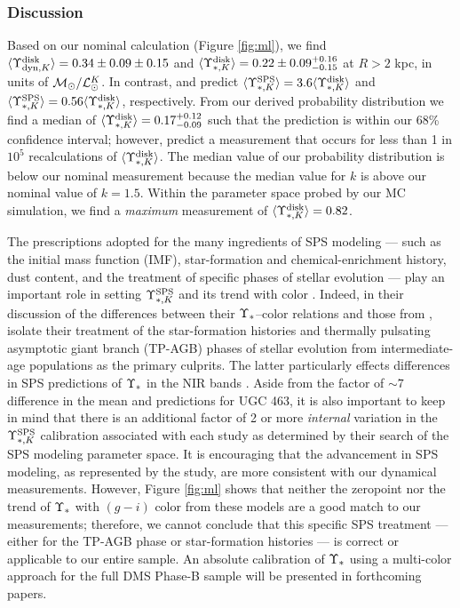 \documentclass[apj,iop,numberedappendix]{emulateapj}
\begin{document}
\subsubsection{Discussion}
\label{sec:mldisc}

Based on our nominal calculation (Figure \ref{fig:ml}), we find
$\langle \Upsilon_{{\rm dyn},K}^{\rm disk} \rangle = 0.34\pm0.09\pm0.15$ and $\langle \Upsilon_{\ast,K}^{\rm disk} \rangle =
0.22\pm0.09^{+0.16}_{-0.15}$ at $R>2$ kpc, in units of $\mathcal{M}_\odot/\mathcal{L}_\odot^K$.  In
contrast,  and 
predict $\langle \Upsilon_{\ast,K}^{\rm SPS} \rangle = 3.6 \langle \Upsilon_{\ast,K}^{\rm disk} \rangle$ and $\langle \Upsilon_{\ast,K}^{\rm SPS} \rangle =
0.56 \langle \Upsilon_{\ast,K}^{\rm disk} \rangle$, respectively.  From our derived probability
distribution we find a median of $\langle \Upsilon_{\ast,K}^{\rm disk} \rangle = 0.17^{+0.12}_{-0.09}$
such that the  prediction is within our 68\%
confidence interval; however,  predict a
measurement that occurs for less than 1 in $10^5$ recalculations of
$\langle \Upsilon_{\ast,K}^{\rm disk} \rangle$.  The median value of our probability distribution is
below our nominal measurement because the median value for $k$ is above our
nominal value of $k=1.5$.  Within the parameter space probed by our MC
simulation, we find a {\it maximum} measurement of $\langle \Upsilon_{\ast,K}^{\rm disk} \rangle=0.82$.

The prescriptions adopted for the many ingredients of SPS modeling --- such as
the initial mass function (IMF), star-formation and chemical-enrichment history,
dust content, and the treatment of specific phases of stellar evolution --- play
an important role in setting $\Upsilon_{\ast,K}^{\rm SPS}$ and its trend with color
\citep{2004MNRAS.347..691P, 2009ApJ...699..486C, 2010ApJ...708...58C,
2010ApJ...712..833C}.  Indeed, in their discussion of the differences between
their $\Upsilon_\ast$--color relations and those from ,
 isolate their treatment of the star-formation
histories and thermally pulsating asymptotic giant branch (TP-AGB) phases of
stellar evolution from intermediate-age populations as the primary culprits.
The latter particularly effects differences in SPS predictions of $\Upsilon_\ast$ in the
NIR bands \citep{2005MNRAS.362..799M}.  Aside from the factor of $\sim7$
difference in the mean  and
 predictions for UGC 463, it is also important
to keep in mind that there is an additional factor of 2 or more {\it internal}
variation in the $\Upsilon_{\ast,K}^{\rm SPS}$ calibration associated with each study as determined
by their search of the SPS modeling parameter space.  It is encouraging that the
advancement in SPS modeling, as represented by the
 study, are more consistent with our dynamical
measurements.  However, Figure \ref{fig:ml} shows that neither the zeropoint nor
the trend of $\Upsilon_\ast$ with $(g-i)$ color from these models are a good match to our
measurements; therefore, we cannot conclude that this specific SPS treatment ---
either for the TP-AGB phase or star-formation histories --- is correct or
applicable to our entire sample.  An absolute calibration of $\Upsilon_\ast$ using a
multi-color approach for the full DMS Phase-B sample will be presented in
forthcoming papers.
\end{document}
